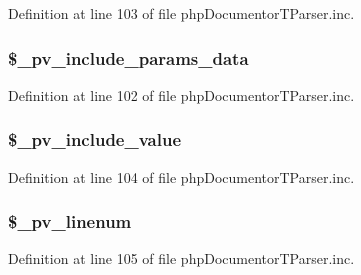 \-Definition at line 103 of file php\-Documentor\-T\-Parser.\-inc.

\hypertarget{classphp_documentor_t_parser_a1b269ebf6b132cc026642cced55fc2d6}{
\subsubsection[{\$\-\_\-pv\-\_\-include\-\_\-params\-\_\-data}]{\setlength{\rightskip}{0pt plus 5cm}\$\-\_\-pv\-\_\-include\-\_\-params\-\_\-data}}\label{classphp_documentor_t_parser_a1b269ebf6b132cc026642cced55fc2d6}


\-Definition at line 102 of file php\-Documentor\-T\-Parser.\-inc.

\hypertarget{classphp_documentor_t_parser_a3149a82355e9e1d73ef60f307cf99a25}{
\subsubsection[{\$\-\_\-pv\-\_\-include\-\_\-value}]{\setlength{\rightskip}{0pt plus 5cm}\$\-\_\-pv\-\_\-include\-\_\-value}}\label{classphp_documentor_t_parser_a3149a82355e9e1d73ef60f307cf99a25}


\-Definition at line 104 of file php\-Documentor\-T\-Parser.\-inc.

\hypertarget{classphp_documentor_t_parser_a81261f6bf2747b597f20ba296f2af363}{
\subsubsection[{\$\-\_\-pv\-\_\-linenum}]{\setlength{\rightskip}{0pt plus 5cm}\$\-\_\-pv\-\_\-linenum}}\label{classphp_documentor_t_parser_a81261f6bf2747b597f20ba296f2af363}


\-Definition at line 105 of file php\-Documentor\-T\-Parser.\-inc.

